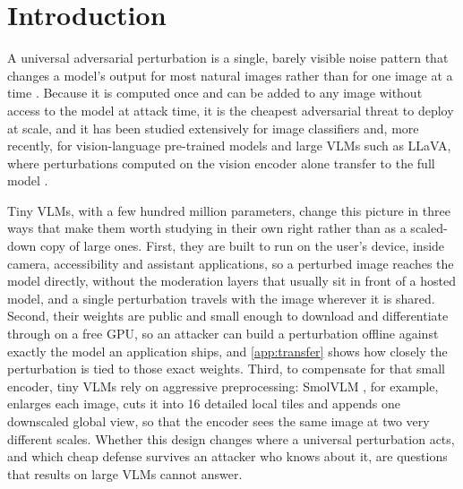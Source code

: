 \documentclass[10pt,twocolumn,letterpaper]{article}
\begin{document}
\section{Introduction}
\label{sec:intro}

A universal adversarial perturbation is a single, barely visible noise pattern that changes a model's output for most natural images rather than for one image at a time \cite{moosavi2017universal}. Because it is computed once and can be added to any image without access to the model at attack time, it is the cheapest adversarial threat to deploy at scale, and it has been studied extensively for image classifiers and, more recently, for vision-language pre-trained models and large VLMs such as LLaVA, where perturbations computed on the vision encoder alone transfer to the full model \cite{kim2024vevuap,zhang2024etu,fang2024cpgc}.

Tiny VLMs, with a few hundred million parameters, change this picture in three ways that make them worth studying in their own right rather than as a scaled-down copy of large ones. First, they are built to run on the user's device, inside camera, accessibility and assistant applications, so a perturbed image reaches the model directly, without the moderation layers that usually sit in front of a hosted model, and a single perturbation travels with the image wherever it is shared. Second, their weights are public and small enough to download and differentiate through on a free GPU, so an attacker can build a perturbation offline against exactly the model an application ships, and \cref{app:transfer} shows how closely the perturbation is tied to those exact weights. Third, to compensate for that small encoder, tiny VLMs rely on aggressive preprocessing: SmolVLM \cite{marafioti2025smolvlm}, for example, enlarges each image, cuts it into 16 detailed local tiles and appends one downscaled global view, so that the encoder sees the same image at two very different scales. Whether this design changes where a universal perturbation acts, and which cheap defense survives an attacker who knows about it, are questions that results on large VLMs cannot answer.
\end{document}
